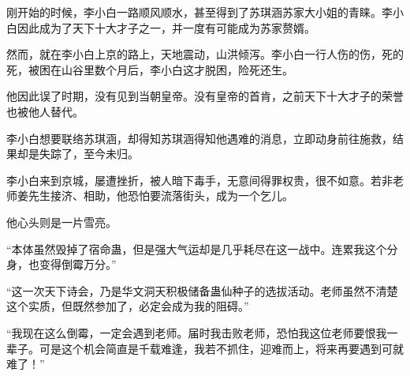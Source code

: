 \begin{this_body}
刚开始的时候，李小白一路顺风顺水，甚至得到了苏琪涵苏家大小姐的青睐。李小白因此成为了天下十大才子之一，并一度有可能成为苏家赘婿。

然而，就在李小白上京的路上，天地震动，山洪倾泻。李小白一行人伤的伤，死的死，被困在山谷里数个月后，李小白这才脱困，险死还生。

他因此误了时期，没有见到当朝皇帝。没有皇帝的首肯，之前天下十大才子的荣誉也被他人替代。

李小白想要联络苏琪涵，却得知苏琪涵得知他遇难的消息，立即动身前往施救，结果却是失踪了，至今未归。

李小白来到京城，屡遭挫折，被人暗下毒手，无意间得罪权贵，很不如意。若非老师姜先生接济、相助，他恐怕要流落街头，成为一个乞儿。

他心头则是一片雪亮。

“本体虽然毁掉了宿命蛊，但是强大气运却是几乎耗尽在这一战中。连累我这个分身，也变得倒霉万分。”

“这一次天下诗会，乃是华文洞天积极储备蛊仙种子的选拔活动。老师虽然不清楚这个实质，但既然参加了，必定会成为我的阻碍。”

“我现在这么倒霉，一定会遇到老师。届时我击败老师，恐怕我这位老师要恨我一辈子。可是这个机会简直是千载难逢，我若不抓住，迎难而上，将来再要遇到可就难了！”

\end{this_body}

